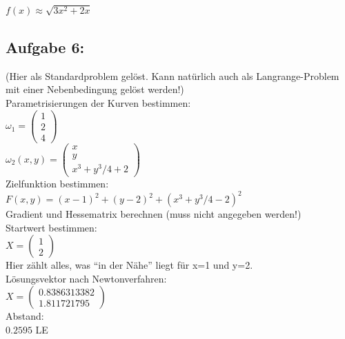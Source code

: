\documentclass[11pt,final]{scrreprt}
\begin{document}
$ f(x) \approx \sqrt{3x^2 + 2x} $\\


\subsection{Aufgabe 6:}
(Hier als Standardproblem gelöst. Kann natürlich auch als Langrange-Problem mit einer Nebenbedingung gelöst werden!)\\

Parametrisierungen der Kurven bestimmen:\\

$ \omega_1=\left(\begin{matrix}
1\\2\\4
\end{matrix}\right) $\\

$ \omega_2(x, y)=\left(\begin{matrix}
x\\y\\x^3 + y^3/4 + 2
\end{matrix}\right) $\\

Zielfunktion bestimmen:\\

$ F(x, y) = (x-1)^2 + (y-2)^2 + (x^3+y^3/4 - 2)^2 $\\

Gradient und Hessematrix berechnen (muss nicht angegeben werden!)\\

Startwert bestimmen:\\
$ X=\left(\begin{matrix}
1\\2
\end{matrix}\right) $\\
Hier zählt alles, was ``in der Nähe'' liegt für x=1 und y=2.\\

Lösungsvektor nach Newtonverfahren:\\
$ X=\left(\begin{matrix}
0.8386313382\\1.811721795
\end{matrix}\right) $\\

Abstand:\\
$0.2595$ LE\\
\end{document}

